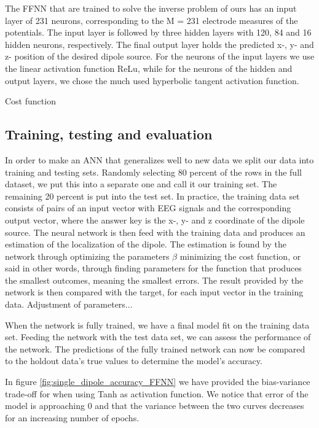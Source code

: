 \documentclass[a4paper, UKenglish, 11pt]{uiomaster}
\begin{document}
The FFNN that are trained to solve the inverse problem of ours has an input layer of 231 neurons, corresponding to the M = 231 electrode measures of the potentials. The input layer is followed by three hidden layers with 120, 84 and 16 hidden neurons, respectively. The final output layer holds the predicted x-, y- and z- position of the desired dipole source. For the neurons of the input layers we use the linear activation function ReLu, while for the neurons of the hidden and output layers, we chose the much used hyperbolic tangent activation function.

Cost function

\subsection{Training, testing and evaluation}
In order to make an ANN that generalizes well to new data we split our data into training and testing sets. Randomly selecting 80 percent of the rows in the full dataset, we put this into a separate one and call it our training set. The remaining 20 percent is put into the test set. In practice, the training data set consists of pairs of an input vector with EEG signals and the corresponding output vector, where the answer key is the x-, y- and z coordinate of the dipole source. The neural network is then feed with the training data and produces an estimation of the localization of the dipole. The estimation is found by the network through optimizing the parameters $\beta$ minimizing the cost function, or said in other words, through finding parameters for the function that produces the smallest outcomes, meaning the smallest errors. The result provided by the network is then compared with the target, for each input vector in the training data. Adjustment of parameters...

When the network is fully trained, we have a final model fit on the training data set. Feeding the network with the test data set, we can assess the performance of the network. The predictions of the fully trained network can now be compared to the holdout data's true values to determine the model's accuracy.

In figure \ref{fig:single_dipole_accuracy_FFNN} we have provided the bias-variance trade-off for when using Tanh as activation function. We notice that error of the model is approaching 0 and that the variance between the two curves decreases for an increasing number of epochs.
\end{document}
